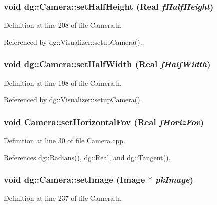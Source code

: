 \subsubsection{\setlength{\rightskip}{0pt plus 5cm}void dg::Camera::set\-Half\-Height ({\bf Real} {\em f\-Half\-Height})\hspace{0.3cm}{\tt  [inline]}}\label{classdg_1_1Camera_a19}




Definition at line 208 of file Camera.h.

Referenced by dg::Visualizer::setup\-Camera().
\subsubsection{\setlength{\rightskip}{0pt plus 5cm}void dg::Camera::set\-Half\-Width ({\bf Real} {\em f\-Half\-Width})\hspace{0.3cm}{\tt  [inline]}}\label{classdg_1_1Camera_a15}




Definition at line 198 of file Camera.h.

Referenced by dg::Visualizer::setup\-Camera().
\subsubsection{\setlength{\rightskip}{0pt plus 5cm}void Camera::set\-Horizontal\-Fov ({\bf Real} {\em f\-Horiz\-Fov})\hspace{0.3cm}{\tt  [inline]}}\label{classdg_1_1Camera_a17}




Definition at line 30 of file Camera.cpp.

References dg::Radians(), dg::Real, and dg::Tangent().
\subsubsection{\setlength{\rightskip}{0pt plus 5cm}void dg::Camera::set\-Image ({\bf Image} $\ast$ {\em pk\-Image})\hspace{0.3cm}{\tt  [inline]}}\label{classdg_1_1Camera_a27}




Definition at line 237 of file Camera.h.

